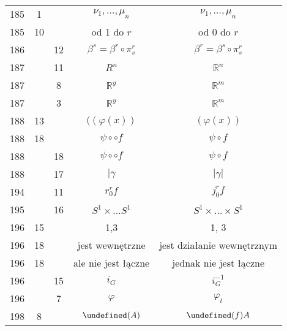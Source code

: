 \documentclass[a4paper,11pt]{article}
\newcommand{\mb}{\mathbb}
\newcommand{\mc}{\mathcal}
\newcommand{\ld}{\ldots}
\newcommand{\ti}{\times}
\newcommand{\be}{\beta}
\newcommand{\ga}{\gamma}
\newcommand{\vp}{\varphi}
\newcommand{\R}{\mb{R}}
\let\L\undefined
\newcommand{\L}{\mc{L}}
\begin{document}
\begin{center}
\begin{tabular}{|c|c|c|c|c|}
    185 &  1 & & $\nu_{ 1 },\!\ld,\! \mu_{ n }$
           & $\nu_{ 1 }, \ld, \mu_{ n }$ \\
    185 & 10 & & od 1 do $r$ & od 0 do $r$ \\
    186 & & 12 & $\be^{ s } = \be^{ r } \circ \pi^{ r }_{ s }$
           & $\be^{ r } = \be^{ s } \circ \pi^{ r }_{ s }$ \\
    187 & & 11 & $R^{ n }$ & $\R^{ n }$ \\
    187 & &  8 & $\R^{ y }$ & $\R^{ m }$ \\
    187 & &  3 & $\R^{ y }$ & $\R^{ m }$ \\
    188 & 13 & & $( ( \vp( x ) )$ & $( \vp( x ) )$ \\
    188 & 18 & & $\psi \circ \circ f$ & $\psi \circ f$ \\
    188 & & 18 & $\psi \circ \circ f$ & $\psi \circ f$ \\
    188 & & 17 & $| \ga$ & $| \ga |$ \\
    194 & & 11 & $r^{ r }_{ 0 }f$ & $j^{ r }_{ 0 }f$ \\
    195 & & 16 & $S^{ 1 } \ti \ld S^{ 1 }$ & $S^{ 1 } \ti \ld \ti S^{ 1 }$ \\
    196 & 15 & & 1,3 & 1, 3 \\
    196 & 18 & & jest wewnętrzne & jest działanie wewnętrznym \\
    196 & 18 & & ale nie jest łączne & jednak nie jest łączne \\
    196 & & 15 & $i_{ G }$ & $i_{ G }^{ -1 }$ \\
    196 & &  7 & $\vp$ & $\vp_{ t }$ \\
    198 & 8 & & $\L( A )$ & $\L( f )A$ \\
    \hline
  \end{tabular}


\end{center}
\end{document}
